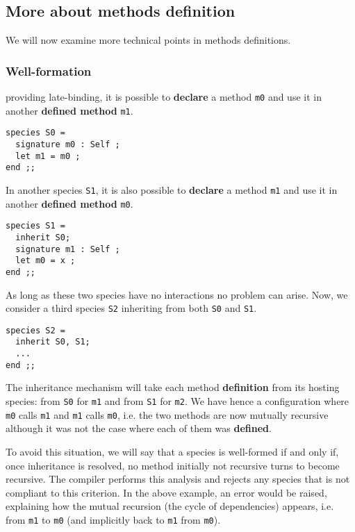 
\subsection{More about methods definition}
We will now examine more technical points in methods definitions.
\subsubsection{Well-formation}
\label{well-formation}

{\focal} providing late-binding, it is possible to {\bf declare} a
method {\tt m0} and use it in another {\bf defined method} {\tt m1}.

{\scriptsize
\begin{lstlisting}
species S0 =
  signature m0 : Self ;
  let m1 = m0 ;
end ;;
\end{lstlisting}
}

In another species {\tt S1}, it is also possible to {\bf declare} a
method {\tt m1} and use it in another {\bf defined method} {\tt m0}.
{\scriptsize
\begin{lstlisting}
species S1 =
  inherit S0;
  signature m1 : Self ;
  let m0 = x ;
end ;;
\end{lstlisting}
}

As long as these two species have no interactions no problem can arise. Now, we
consider a third species {\tt S2} inheriting from both {\tt S0} and
{\tt S1}.
{\scriptsize
\begin{lstlisting}
species S2 =
  inherit S0, S1;
  ...
end ;;
\end{lstlisting}
}

The inheritance mechanism will take each method {\bf definition} from
its hosting species: from {\tt S0} for {\tt m1} and from {\tt S1} for
{\tt m2}. We have hence a configuration where {\tt m0} calls {\tt m1}
and {\tt m1} calls {\tt m0}, i.e. the two methods are now mutually
recursive although it was not the case where each of them was
{\bf defined}.

To avoid this situation, we will say that a species is well-formed if
and only if, once inheritance is resolved, no method initially not
recursive turns to become recursive. The {\focal} compiler performs this
analysis and rejects any species that is not compliant to this
criterion. In the above example, an error would be raised, explaining
how the mutual recursion (the cycle of dependencies) appears,
i.e. from {\tt m1} to {\tt m0} (and implicitly back to {\tt m1} from
{\tt m0}).

